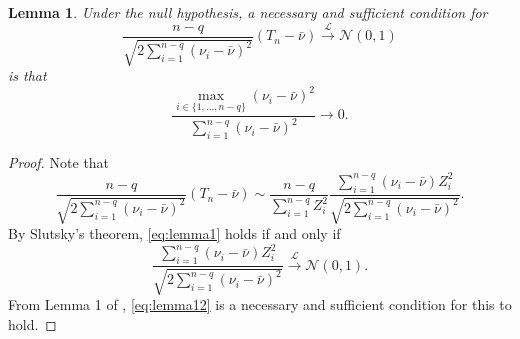 \documentclass[11pt]{article}
\theoremstyle{plain}
\newtheorem{lemma}{\quad\quad Lemma}
\theoremstyle{definition}
\theoremstyle{remark}
\begin{document}
\begin{lemma}
    Under the null hypothesis, a necessary and sufficient condition for
    \begin{equation}\label{eq:lemma1}
        \frac{n-q}{
        \sqrt{2\sum_{i=1}^{n-q}(\nu_i-\bar{\nu})^2}
        }
        (T_n- \bar \nu)
        \xrightarrow{\mathcal L} \mathcal N (0,1)
    \end{equation}
    is that
    \begin{equation}\label{eq:lemma12}
        \frac{\max_{i\in\{1,\ldots, n-q\}} (\nu_i- \bar \nu)^2}{\sum_{i=1}^{n-q}(\nu_i- \bar \nu)^2} \to 0.
    \end{equation}
\end{lemma}
\begin{proof}
    Note that 
    \begin{equation*}
        \frac{n-q}{
        \sqrt{2\sum_{i=1}^{n-q}(\nu_i-\bar{\nu})^2}
        }
        (T_n- \bar \nu)
    \sim
        \frac{n-q}{
    \sum_{i=1}^{n-q} Z_i^2
        }
    \frac{\sum_{i=1}^{n-q} (\nu_i- \bar \nu) Z_i^2}{
        \sqrt{2\sum_{i=1}^{n-q}(\nu_i-\bar{\nu})^2}
    }
    .
    \end{equation*}
    By Slutsky's theorem, \eqref{eq:lemma1} holds if and only if
    \begin{equation*}
    \frac{\sum_{i=1}^{n-q} (\nu_i- \bar \nu) Z_i^2}{
        \sqrt{2\sum_{i=1}^{n-q}(\nu_i-\bar{\nu})^2}
    }
    \xrightarrow{\mathcal L} \mathcal N (0,1).
    \end{equation*}
    From Lemma 1 of \cite{WANG2018225}, \eqref{eq:lemma12} is a necessary and sufficient condition for this to hold.
\end{proof}










\end{document}
